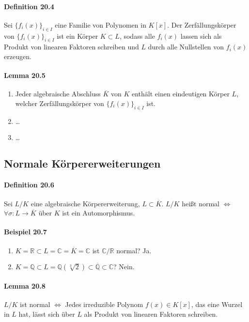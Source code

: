 \documentclass{scrartcl}
\newcommand{\q}[1]{\overline{#1}} %
\newcommand{\Q}{\mathbb{Q}}
\newcommand{\R}{\mathbb{R}}
\newcommand{\C}{\mathbb{C}}
\begin{document}
\paragraph{Definition 20.4}
Sei $\{f_i(x)\}_{i \in I}$ eine Familie von Polynomen in $K[x]$. Der
Zerfällungskörper von $\{f_i(x)\}_{i \in I}$ ist ein Körper $K \subset L$,
sodass alle $f_i(x)$ lassen sich als Produkt von linearen Faktoren schreiben und
$L$ durch alle Nullstellen von $f_i(x)$ erzeugen.

\paragraph{Lemma 20.5}
\begin{enumerate}{}
\item Jeder algebraische Abschluss $\q{K}$ von $K$ enthält einen eindeutigen
  Körper $L$, welcher Zerfällungskörper von $\{f_i(x)\}_{i \in I}$ ist.
\item \dots
\item \dots
\end{enumerate}

\subsection{Normale Körpererweiterungen}

\paragraph{Definition 20.6}
Sei $L/K$ eine algebraische Körpererweiterung, $L \subset \q{K}$. $L/K$ heißt
normal $\iff$ $\forall \sigma: L \to \q{K}$ über $K$ ist ein Automorphismus.

\paragraph{Beispiel 20.7}
\begin{enumerate}{}
\item $K=\R \subset L = \C = \q{K} = \C$ ist $\C/\R$ normal? Ja.
\item $K=\Q \subset L = \Q(\sqrt[3]{2}) \subset \q{\Q} \subset \C$? Nein.
\end{enumerate}

\paragraph{Lemma 20.8}
$L/K$ ist normal $\Leftrightarrow$ Jedes irreduzible Polynom $f(x) \in K[x]$,
das eine Wurzel in $L$ hat, lässt sich über $L$ als Produkt von linearen
Faktoren schreiben.
\end{document}

